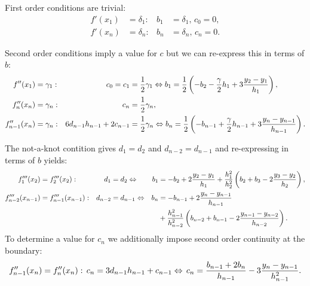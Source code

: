 First order conditions are trivial:
\begin{equation*}
\begin{aligned}
    f'(x_1)&=\delta_1: & b_1 & = \delta_1,\, c_0 = 0,\\
    f'(x_n)&=\delta_n: & b_n & = \delta_n,\, c_n = 0.
\end{aligned}
\end{equation*}

Second order conditions imply a value for $c$ but we can re-express
this in terms of $b$:
\begin{equation*}
\begin{aligned}
    f''(x_1)&=\gamma_1: & c_0 = c_1 &= \frac{1}{2}\gamma_1 \Leftrightarrow
        b_1 = \frac{1}{2}\left(-b_2 -\frac{\gamma}{2} h_1
            + 3 \frac{y_2-y_1}{h_1}\right),\\
    f_n''(x_n)&=\gamma_n: & c_n &= \frac{1}{2}\gamma_n,\\
            f_{n-1}''(x_n)&=\gamma_n: & 6 d_{n-1}h_{n-1} + 2 c_{n-1} &= \frac{1}{2}\gamma_n \Leftrightarrow
            b_n = \frac{1}{2}\left(-b_{n-1} +\frac{\gamma}{2} h_{n-1}
            + 3 \frac{y_n-y_{n-1}}{h_{n-1}}\right).\\
\end{aligned}
\end{equation*}

The not-a-knot contition gives $d_1=d_2$ and $d_{n-2}=d_{n-1}$ and
re-expressing in terms of $b$ yields:
\begin{equation*}
\begin{aligned}
    f_1'''(x_2)&=f_2'''(x_2): & d_1&=d_2 \Leftrightarrow &
    b_1 & = -b_2+2\frac{y_2-y_1}{h_1}+\frac{h_1^2}{h_2^2}
        \left(b_2+b_3-2\frac{y_3-y_2}{h_2}\right),\\
    f_{n-2}'''(x_{n-1})&=f_{n-1}'''(x_{n-1}): & d_{n-2}&=d_{n-1}\Leftrightarrow&
    b_n & = -b_{n-1}+2\frac{y_n-y_{n-1}}{h_{n-1}}\\
        & & & & & +\frac{h_{n-1}^2}{h_{n-2}^2}
        \left(b_{n-2}+b_{n-1}-2\frac{y_{n-1}-y_{n-2}}{h_{n-2}}\right).
\end{aligned}
\end{equation*}
To determine a value for $c_n$ we additionally impose second order
continuity at the boundary:
\begin{equation*}
    f_{n-1}''(x_n)=f_n''(x_n): \, c_n =3d_{n-1}h_{n-1}+c_{n-1} \Leftrightarrow\,
        c_n=\frac{b_{n-1}+2 b_n}{h_{n-1}}-3\frac{y_n-y_{n-1}}{h_{n-1}^2}.
\end{equation*}


